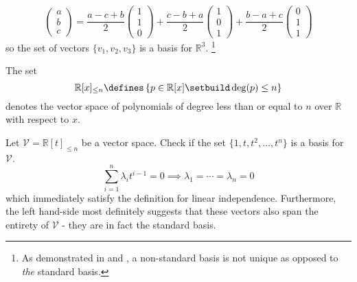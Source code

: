 \begin{exm}
\begin{equation*}
\begin{pmatrix}
			a \\b\\c
		\end{pmatrix}=
		\frac{a-c+b}{2}\begin{pmatrix}
			1 \\1\\0
		\end{pmatrix}+\frac{c-b+a}{2}\begin{pmatrix}
			1 \\0\\1
		\end{pmatrix}+\frac{b-a+c}{2}\begin{pmatrix}
			0 \\1\\1
		\end{pmatrix}
	\end{equation*}
	so the set of vectors $\{v_1,v_2,v_3\}$ is a basis for $\mathbb{R}^3$.
	\footnote{As demonstrated in  and
		, a non-standard basis is not unique
		as opposed to \textit{the} standard basis.}
\end{exm}

\begin{rem}\label{rem-polynomial-vector-space}
	The set
	\begin{equation}
		\mathbb{R}[x]_{\leq n}\defines\left\{p\in\mathbb{R}[x]\setbuild\deg(p)\leq n\right\}
	\end{equation}
	denotes the vector space of polynomials of degree less than or equal to $n$
	over $\mathbb{R}$ with respect to $x$.
\end{rem}

\begin{exm}\label{exm-vector-basis:3}
	Let $\mathcal{V}=\mathbb{R}[t]_{\leq n}$ be a vector space. Check if the
	set $\{1,t,t^2,\dots,t^n\}$ is a basis for $\mathcal{V}$.
	\begin{equation*}
		\sum_{i=1}^n \lambda_i t^{i-1} = 0 \implies \lambda_1=\cdots=\lambda_n=0
	\end{equation*}
	which immediately satisfy the definition for linear independence. Furthermore,
	the left hand-side most definitely suggests that these vectors also span
	the entirety of $\mathcal{V}$ - they are in fact the standard basis.
\end{exm}
